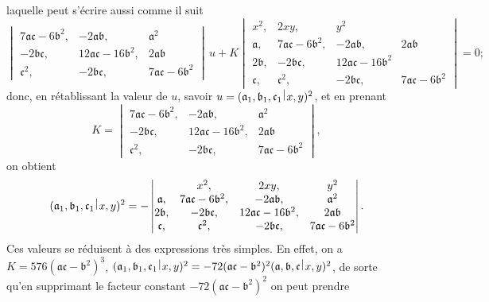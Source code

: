 \documentclass[11pt,a4paper]{book}
\theoremstyle{plain}
\newcommand{\wrule}{\hspace{-0.1em}\mid\hspace{-0.1em}}
\begin{document}
laquelle peut s'\'{e}crire aussi comme il suit
\[
\begin{vmatrix}
7\mathfrak{a}\mathfrak{c}-6\mathfrak{b}^2, & -2\mathfrak{a}\mathfrak{b}, & \mathfrak{a}^2\\
-2\mathfrak{b}\mathfrak{c}, & 12\mathfrak{a}\mathfrak{c}-16\mathfrak{b}^2, & 2\mathfrak{a}\mathfrak{b}\\
\mathfrak{c}^2, & -2\mathfrak{b}\mathfrak{c}, & 7\mathfrak{a}\mathfrak{c}-6\mathfrak{b}^2
\end{vmatrix}\,u
+K\begin{vmatrix}
x^2, & 2xy, & y^2\\
\mathfrak{a}, & 7\mathfrak{a}\mathfrak{c}-6\mathfrak{b}^2, & -2\mathfrak{a}\mathfrak{b}, & 2\mathfrak{a}\mathfrak{b}\\
2\mathfrak{b}, & -2\mathfrak{b}\mathfrak{c}, & 12\mathfrak{a}\mathfrak{c}-16\mathfrak{b}^2\\
\mathfrak{c}, & \mathfrak{c}^2, & -2\mathfrak{b}\mathfrak{c}, & 7\mathfrak{a}\mathfrak{c}-6\mathfrak{b}^2
\end{vmatrix}=0;
\]
donc, en r\'{e}tablissant la valeur de $u$, savoir $u=(\mathfrak{a}_1,\mathfrak{b}_1,\mathfrak{c}_1\,\raisebox{0.5ex}{$\wrule$}\,x,y)^2$, et en prenant
\[
K=\begin{vmatrix}
7\mathfrak{a}\mathfrak{c}-6\mathfrak{b}^2, & -2\mathfrak{a}\mathfrak{b}, & \mathfrak{a}^2\\
-2\mathfrak{b}\mathfrak{c}, & 12\mathfrak{a}\mathfrak{c}-16\mathfrak{b}^2, & 2\mathfrak{a}\mathfrak{b}\\
\mathfrak{c}^2, & -2\mathfrak{b}\mathfrak{c}, & 7\mathfrak{a}\mathfrak{c}-6\mathfrak{b}^2
\end{vmatrix},
\]
on obtient
\[
(\mathfrak{a}_1,\mathfrak{b}_1,\mathfrak{c}_1\,\raisebox{0.5ex}{$\wrule$}\,x,y)^2
=-\begin{vmatrix}
\,\, & x^2, & 2xy, & y^2\\
\mathfrak{a}, & 7\mathfrak{a}\mathfrak{c}-6\mathfrak{b}^2, & -2\mathfrak{a}\mathfrak{b}, & \mathfrak{a}^2\\
2\mathfrak{b}, & -2\mathfrak{b}\mathfrak{c}, & 12\mathfrak{a}\mathfrak{c}-16\mathfrak{b}^2, & 2\mathfrak{a}\mathfrak{b}\\
\mathfrak{c}, & \mathfrak{c}^2, & -2\mathfrak{b}\mathfrak{c}, & 7\mathfrak{a}\mathfrak{c}-6\mathfrak{b}^2
\end{vmatrix}.
\]
Ces valeurs se r\'{e}duisent \`{a} des expressions tr\`{e}s simples. En effet, on a $K=576(\mathfrak{a}\mathfrak{c}-\mathfrak{b}^2)^3$, $(\mathfrak{a}_1,\mathfrak{b}_1,\mathfrak{c}_1\,\raisebox{0.5ex}{$\wrule$}\,x,y)^2=-72(\mathfrak{a}\mathfrak{c}-\mathfrak{b}^2)^2(\mathfrak{a},\mathfrak{b},\mathfrak{c}\,\raisebox{0.5ex}{$\wrule$}\,x,y)^2$, de sorte qu'en supprimant le facteur constant $-72(\mathfrak{a}\mathfrak{c}-\mathfrak{b}^2)^2$ on peut prendre
\end{document}
